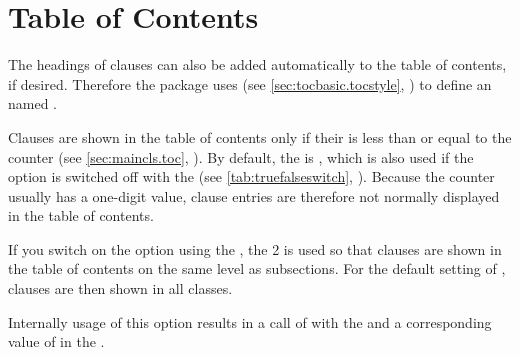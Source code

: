 

\section{Table of Contents}

The headings of clauses can also be added automatically to the table of
contents, if desired.
Therefore the package uses
(see \autoref{sec:tocbasic.tocstyle},
) to define an  named .


\begin{Declaration}
\end{Declaration}
Clauses are shown in the table of contents only if their
 is less than or equal to the
%
 counter
(see \autoref{sec:maincls.toc}, ). By
default, the  is , which is also used if
the option is switched off with the  (see
\autoref{tab:truefalseswitch}, ). Because the
 counter usually has a one-digit value,
clause entries are therefore not normally displayed in the table of contents.

If you switch on the option using the %
, the  2 is used
so that clauses are shown in the table of contents on the same level as
subsections. For the default setting of ,
clauses are then shown in all \KOMAScript{} classes.

Internally usage of this option results in
a call of
with the   and a corresponding value of
 in the .%
\EndIndexGroup


